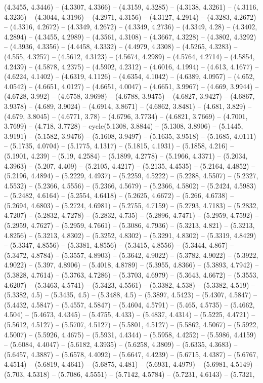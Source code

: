 (4.3455, 4.3446) -- (4.3307, 4.3366) -- (4.3159, 4.3285) -- (4.3138, 4.3261) -- (4.3116, 4.3236) -- (4.3044, 4.3196) -- (4.2971, 4.3156) -- (4.3127, 4.2914) -- (4.3283, 4.2672) -- (4.3316, 4.2672) -- (4.3349, 4.2672) -- (4.3349, 4.2736) -- (4.3349, 4.28) -- (4.3402, 4.2894) -- (4.3455, 4.2989) -- (4.3561, 4.3108) -- (4.3667, 4.3228) -- (4.3802, 4.3292) -- (4.3936, 4.3356) -- (4.4458, 4.3332) -- (4.4979, 4.3308) -- (4.5265, 4.3283) -- (4.555, 4.3257) -- (4.5612, 4.3123) -- (4.5674, 4.2989) -- (4.5764, 4.2714) -- (4.5854, 4.2439) -- (4.5878, 4.2375) -- (4.5902, 4.2312) -- (4.6016, 4.1994) -- (4.613, 4.1677) -- (4.6224, 4.1402) -- (4.6319, 4.1126) -- (4.6354, 4.1042) -- (4.6389, 4.0957) -- (4.652, 4.0542) -- (4.6651, 4.0127) -- (4.6651, 4.0047) -- (4.6651, 3.9967) -- (4.669, 3.9944) -- (4.6728, 3.992) -- (4.6758, 3.9698) -- (4.6788, 3.9475) -- (4.6827, 3.9427) -- (4.6867, 3.9378) -- (4.689, 3.9024) -- (4.6914, 3.8671) -- (4.6862, 3.8481) -- (4.681, 3.829) -- (4.679, 3.8045) -- (4.6771, 3.78) -- (4.6796, 3.7734) -- (4.6821, 3.7669) -- (4.7001, 3.7699) -- (4.718, 3.7728) -- cycle(5.1308, 3.8844) -- (5.1308, 3.8906) -- (5.1445, 3.9191) -- (5.1582, 3.9476) -- (5.1608, 3.9497) -- (5.1635, 3.9518) -- (5.1685, 4.0111) -- (5.1735, 4.0704) -- (5.1775, 4.1317) -- (5.1815, 4.1931) -- (5.1858, 4.216) -- (5.1901, 4.239) -- (5.19, 4.2584) -- (5.1899, 4.2778) -- (5.1966, 4.3371) -- (5.2034, 4.3963) -- (5.207, 4.409) -- (5.2105, 4.4217) -- (5.2135, 4.4535) -- (5.2164, 4.4852) -- (5.2196, 4.4894) -- (5.2229, 4.4937) -- (5.2259, 4.5222) -- (5.2288, 4.5507) -- (5.2327, 4.5532) -- (5.2366, 4.5556) -- (5.2366, 4.5679) -- (5.2366, 4.5802) -- (5.2424, 4.5983) -- (5.2482, 4.6164) -- (5.2554, 4.6418) -- (5.2625, 4.6672) -- (5.266, 4.6738) -- (5.2694, 4.6803) -- (5.2724, 4.6981) -- (5.2755, 4.7159) -- (5.2793, 4.7183) -- (5.2832, 4.7207) -- (5.2832, 4.7278) -- (5.2832, 4.735) -- (5.2896, 4.7471) -- (5.2959, 4.7592) -- (5.2959, 4.7627) -- (5.2959, 4.7661) -- (5.3086, 4.7936) -- (5.3213, 4.821) -- (5.3213, 4.8256) -- (5.3213, 4.8302) -- (5.3252, 4.8302) -- (5.3291, 4.8302) -- (5.3319, 4.8429) -- (5.3347, 4.8556) -- (5.3381, 4.8556) -- (5.3415, 4.8556) -- (5.3444, 4.867) -- (5.3472, 4.8784) -- (5.3557, 4.8903) -- (5.3642, 4.9022) -- (5.3782, 4.9022) -- (5.3922, 4.9022) -- (5.397, 4.8906) -- (5.4018, 4.8789) -- (5.3955, 4.8366) -- (5.3893, 4.7942) -- (5.3828, 4.7614) -- (5.3763, 4.7286) -- (5.3703, 4.6979) -- (5.3643, 4.6672) -- (5.3553, 4.6207) -- (5.3463, 4.5741) -- (5.3423, 4.5561) -- (5.3382, 4.538) -- (5.3382, 4.519) -- (5.3382, 4.5) -- (5.3435, 4.5) -- (5.3488, 4.5) -- (5.3897, 4.5423) -- (5.4307, 4.5847) -- (5.4432, 4.5847) -- (5.4557, 4.5847) -- (5.4604, 4.5791) -- (5.465, 4.5735) -- (5.4662, 4.504) -- (5.4673, 4.4345) -- (5.4755, 4.433) -- (5.4837, 4.4314) -- (5.5225, 4.4721) -- (5.5612, 4.5127) -- (5.5707, 4.5127) -- (5.5801, 4.5127) -- (5.5862, 4.5067) -- (5.5922, 4.5007) -- (5.5926, 4.4675) -- (5.5931, 4.4344) -- (5.5958, 4.4252) -- (5.5986, 4.4159) -- (5.6084, 4.4047) -- (5.6182, 4.3935) -- (5.6258, 4.3809) -- (5.6335, 4.3683) -- (5.6457, 4.3887) -- (5.6578, 4.4092) -- (5.6647, 4.4239) -- (5.6715, 4.4387) -- (5.6767, 4.4514) -- (5.6819, 4.4641) -- (5.6875, 4.481) -- (5.6931, 4.4979) -- (5.6981, 4.5149) -- (5.703, 4.5318) -- (5.7086, 4.5551) -- (5.7142, 4.5784) -- (5.7231, 4.6143) -- (5.7321, 